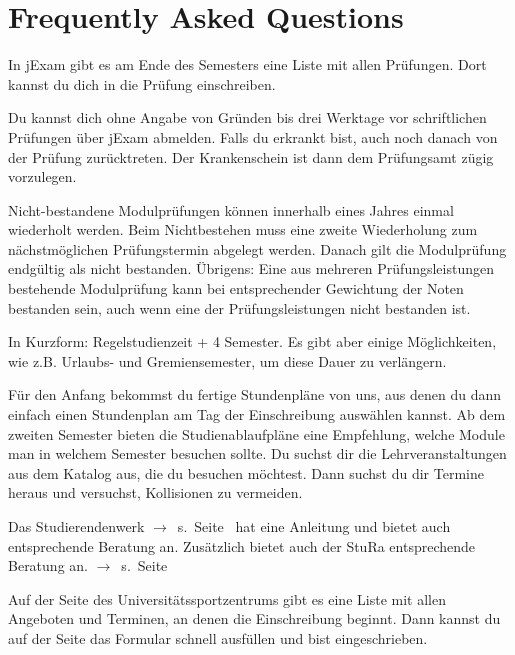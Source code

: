 \chapter*{Frequently Asked Questions}
\label{sec:faq}
In jExam  gibt es am Ende des Semesters eine Liste mit allen Prüfungen. Dort kannst du dich in die Prüfung einschreiben.

Du kannst dich ohne Angabe von Gründen bis drei Werktage vor schriftlichen Prüfungen über jExam abmelden. Falls du erkrankt bist, auch noch danach von der Prüfung zurücktreten. Der Krankenschein ist dann dem Prüfungsamt zügig vorzulegen. 

Nicht-bestandene Modulprüfungen können innerhalb eines Jahres einmal wiederholt werden. Beim Nichtbestehen muss eine zweite Wiederholung zum nächstmöglichen Prüfungstermin abgelegt werden. Danach gilt die Modulprüfung endgültig als nicht bestanden. Übrigens: Eine aus mehreren Prüfungsleistungen bestehende Modulprüfung kann bei entsprechender Gewichtung der Noten bestanden sein, auch wenn eine der Prüfungsleistungen nicht bestanden ist.

In Kurzform: Regelstudienzeit + 4 Semester. Es gibt aber einige Möglichkeiten, wie z.B. Urlaubs- und Gremiensemester, um diese Dauer zu verlängern.

Für den Anfang bekommst du fertige Stundenpläne von uns, aus denen du dann einfach einen Stundenplan am Tag der Einschreibung auswählen kannst. Ab dem zweiten Semester bieten die Studienablaufpläne eine Empfehlung, welche Module man in welchem Semester besuchen sollte. Du suchst dir die Lehrveranstaltungen aus dem Katalog aus, die du besuchen möchtest. Dann suchst du dir Termine heraus und versuchst, Kollisionen zu vermeiden.

Das Studierendenwerk $\rightarrow$~s.~Seite~\pageref{sec:stuwe} hat eine Anleitung und bietet auch entsprechende Beratung an. Zusätzlich bietet auch der StuRa entsprechende Beratung an. $\rightarrow$~s.~Seite~\pageref{sec:stura}

Auf der Seite des Universitätssportzentrums gibt es eine Liste mit allen Angeboten und Terminen, an denen die Einschreibung beginnt. Dann kannst du auf der Seite das Formular schnell ausfüllen und bist eingeschrieben.

